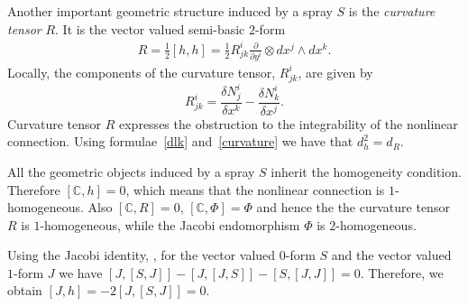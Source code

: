 Another important geometric structure induced by a spray $S$ is
the \emph{curvature tensor} $R$. It is the vector valued semi-basic $2$-form
\begin{gather} R=\frac{1}{2}[h,h]=\frac{1}{2}R^i_{jk}\frac{\partial}{\partial y^i}\otimes dx^j\wedge dx^k. \label{curvature}
\end{gather}
Locally, the components of the curvature tensor, $R^i_{jk}$, are given by
\[
R^i_{jk}=\frac{\delta N^i_j}{\delta x^k} - \frac{\delta N^i_k}{\delta
x^j}.
\] Curvature tensor $R$ expresses the obstruction to the
integrability of the nonlinear connection.  Using formulae~\eqref{dlk}
and~\eqref{curvature} we have that $d_h^2=d_R$.

All the geometric objects induced by a spray $S$ inherit the
homogeneity condition. Therefore $[\mathbb{C}, h]=0$, which means
that the nonlinear connection is $1$-homogeneous. Also $[\mathbb{C},
R]=0$, $[\mathbb{C},\Phi]=\Phi$ and hence the the curvature tensor $R$
is $1$-homogeneous, while the  Jacobi endomorphism $\Phi$
is $2$-homogeneous.

Using the Jacobi identity, \cite[Proposition~2.7]{grifone00} , for the vector valued $0$-form $S$ and the
vector valued $1$-form $J$ we have $[J,[S,J]]-[J,[J,S]]-[S,[J,J]]=0$.
Therefore, we obtain $[J,h]=-2[J,[S,J]]=0$.

